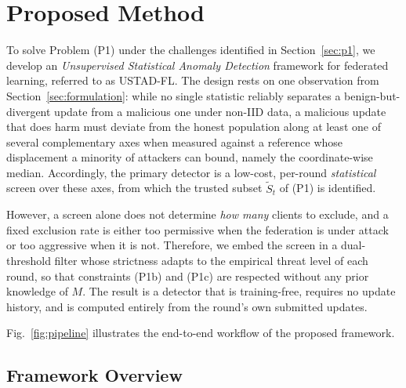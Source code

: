\documentclass[journal]{IEEEtran}
\begin{document}
\section{Proposed Method}
\label{sec:method}

To solve Problem (P1) under the challenges identified in Section~\ref{sec:p1}, we develop an \emph{Unsupervised Statistical Anomaly Detection} framework for federated learning, referred to as USTAD-FL. The design rests on one observation from Section~\ref{sec:formulation}: while no single statistic reliably separates a benign-but-divergent update from a malicious one under non-IID data, a malicious update that does harm must deviate from the honest population along at least one of several complementary axes when measured against a reference whose displacement a minority of attackers can bound, namely the coordinate-wise median. Accordingly, the primary detector is a low-cost, per-round \emph{statistical} screen over these axes, from which the trusted subset $\widetilde{S}_t$ of (P1) is identified.

However, a screen alone does not determine \emph{how many} clients to exclude, and a fixed exclusion rate is either too permissive when the federation is under attack or too aggressive when it is not. Therefore, we embed the screen in a dual-threshold filter whose strictness adapts to the empirical threat level of each round, so that constraints (P1b) and (P1c) are respected without any prior knowledge of $M$. The result is a detector that is training-free, requires no update history, and is computed entirely from the round's own submitted updates.

Fig.~\ref{fig:pipeline} illustrates the end-to-end workflow of the proposed framework.

\subsection{Framework Overview}
\end{document}
